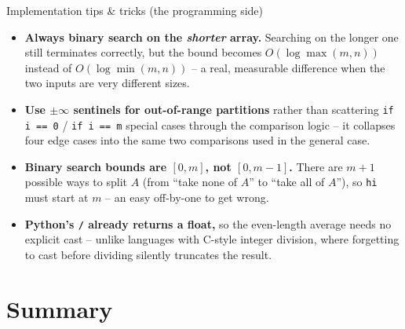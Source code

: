 \documentclass[11pt,aspectratio=169]{beamer}
\begin{document}
\begin{frame}{Implementation tips \& tricks (the programming side)}
  \small
  \begin{itemize}
    \item \textbf{Always binary search on the \emph{shorter} array.} Searching on the
    longer one still terminates correctly, but the bound becomes $O(\log\max(m,n))$
    instead of $O(\log\min(m,n))$ -- a real, measurable difference when the two inputs
    are very different sizes.
    \item \textbf{Use $\pm\infty$ sentinels for out-of-range partitions} rather than
    scattering \texttt{if i == 0} / \texttt{if i == m} special cases through the
    comparison logic -- it collapses four edge cases into the same two comparisons
    used in the general case.
    \item \textbf{Binary search bounds are $[0, m]$, not $[0, m{-}1]$.} There are
    $m+1$ possible ways to split $A$ (from ``take none of $A$'' to ``take all of
    $A$''), so \texttt{hi} must start at $m$ -- an easy off-by-one to get wrong.
    \item \textbf{Python's \texttt{/} already returns a float,} so the even-length
    average needs no explicit cast -- unlike languages with C-style integer division,
    where forgetting to cast before dividing silently truncates the result.
  \end{itemize}
\end{frame}

\section{Summary}
\end{document}
